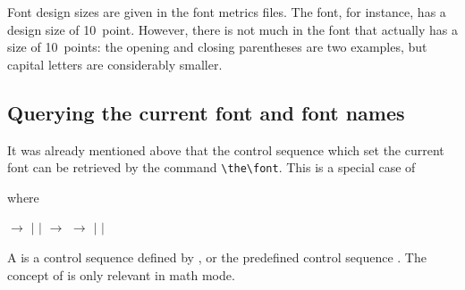 Font design sizes are given in the font metrics files.
The  font, for instance, has a design size
of 10~point. However, there is not much in the font
that actually has a size of 10~points: the opening and closing
parentheses are two examples, but capital
letters are considerably smaller.

\subsection{Querying the current font and font names}

It was already mentioned above that the control sequence
which set the current font can be retrieved by the
command \verb>\the\font>. This is a special case of
\begin{Disp}\end{Disp} where 
\begin{disp} $\longrightarrow$
 $|$  $|$ \nl
{} $\longrightarrow$ 
\nl
{} $\longrightarrow$ 
 $|$  $|$ \end{disp}
A  is a control sequence defined by ,
or the predefined control sequence .
The concept of  is only 
relevant in math mode.

